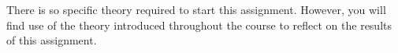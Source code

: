 There is so specific theory required to start this assignment.
However, you will find use of the theory introduced throughout the course to 
reflect on the results of this assignment.
